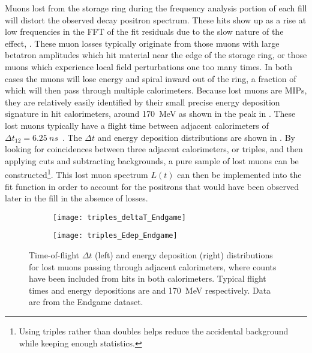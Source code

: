 Muons lost from the storage ring during the frequency analysis portion of each fill will distort the observed decay positron spectrum. These hits show up as a rise at low frequencies in the FFT of the fit residuals due to the slow nature of the effect, . These muon losses typically originate from those muons with large betatron amplitudes which hit material near the edge of the storage ring, or those muons which experience local field perturbations one too many times. In both cases the muons will lose energy and spiral inward out of the ring, a fraction of which will then pass through multiple calorimeters. Because lost muons are MIPs, they are relatively easily identified by their small precise energy deposition signature in hit calorimeters, around \SI{170}{\MeV} as shown in the peak in . These lost muons typically have a flight time between adjacent calorimeters of $\Delta t_{12} = \SI{6.25}{ns}$~\cite{lostmuonspaper,lostmuonsDenverTalk}. The $\Delta t$ and energy deposition distributions are shown in . By looking for coincidences between three adjacent calorimeters, or triples, and then applying cuts and subtracting backgrounds, a pure sample of lost muons can be constructed\footnote{Using triples rather than doubles helps reduce the accidental background while keeping enough statistics.}. This lost muon spectrum $L(t)$ can then be implemented into the fit function in order to account for the positrons that would have been observed later in the fill in the absence of losses.

\begin{figure}
\centering
    \begin{subfigure}[]{0.48\textwidth}
        \centering
        \texttt{[image: triples\_deltaT\_Endgame]}
    \end{subfigure}%
    \begin{subfigure}[]{0.48\textwidth}
        \centering
        \texttt{[image: triples\_Edep\_Endgame]}
    \end{subfigure}
\caption[Lost muon $\Delta t$ and energy deposition distributions]{Time-of-flight $\Delta t$ (left) and energy deposition (right) distributions for lost muons passing through adjacent calorimeters, where counts have been included from hits in both calorimeters. Typical flight times and energy depositions are  and \SI{170}{\MeV} respectively. Data are from the Endgame dataset.}
\label{fig:lostmuondistributions}
\end{figure}


